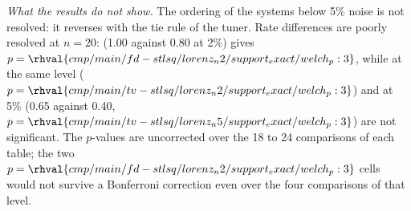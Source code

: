\textit{What the results do not show.} The ordering of the systems below 5\% noise is not resolved: it reverses with the tie rule of the tuner. Rate differences are poorly resolved at $n=20$:  (1.00 against 0.80 at 2\%) gives $p=\rhval{cmp/main/fd-stlsq/lorenz_n2/support_exact/welch_p:3}$, while  at the same level ($p=\rhval{cmp/main/tv-stlsq/lorenz_n2/support_exact/welch_p:3}$) and  at 5\% (0.65 against 0.40, $p=\rhval{cmp/main/tv-stlsq/lorenz_n5/support_exact/welch_p:3}$) are not significant. The $p$-values are uncorrected over the 18 to 24 comparisons of each table; the two $p=\rhval{cmp/main/fd-stlsq/lorenz_n2/support_exact/welch_p:3}$ cells would not survive a Bonferroni correction even over the four comparisons of that level.

